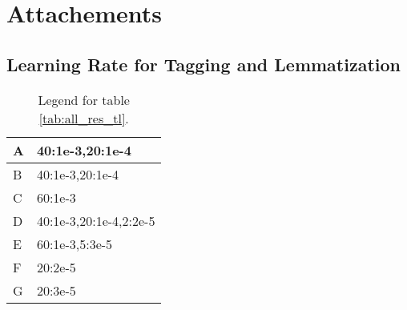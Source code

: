 \chapter{Attachements}
\section{Learning Rate for Tagging and Lemmatization}
\label{att:1}
\begin{table}[!h]
\centering
\begin{tabular}{|l|l|}
\hline
A & 40:1e-3,20:1e-4        \\ \hline
B & 40:1e-3,20:1e-4        \\ \hline
C & 60:1e-3                \\ \hline
D & 40:1e-3,20:1e-4,2:2e-5 \\ \hline
E & 60:1e-3,5:3e-5         \\ \hline
F & 20:2e-5                \\ \hline
G & 20:3e-5                \\ \hline
\end{tabular}
\caption{Legend for table \ref{tab:all_res_tl}. }
\end{table}

\newpage
